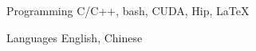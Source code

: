 


\begin{cvskills}


\cvskill
{Programming} %
{C/C++, bash, CUDA, Hip, LaTeX} %


\cvskill
{Languages} %
{English, Chinese} %


\end{cvskills}